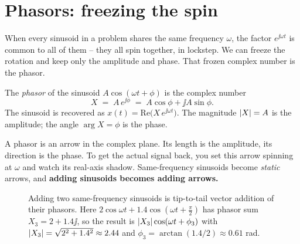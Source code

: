 \section{Phasors: freezing the spin}
\label{ch04:phasors}

When every sinusoid in a problem shares the same frequency $\omega$, the factor $e^{\jj\omega t}$
is common to all of them -- they all spin together, in lockstep. We can freeze the rotation and keep only the amplitude and phase. That frozen complex number is the phasor.

\begin{definition}[Phasor]
\label{ch04:def-phasor}
The \emph{phasor} of the sinusoid $A\cos(\omega t + \phi)$ is the complex number
\[
  X \;=\; A\,e^{\jj\phi} \;=\; A\cos\phi + \jj A\sin\phi .
\]
The sinusoid is recovered as $x(t) = \mathrm{Re}\big(X\,e^{\jj\omega t}\big)$. The magnitude
$\lvert X\rvert = A$ is the amplitude; the angle $\arg X = \phi$ is the phase.
\end{definition}

A phasor is an arrow in the complex plane. Its length is the amplitude, its direction is the phase.
To get the actual signal back, you set this arrow spinning at $\omega$ and watch its real-axis
shadow. Same-frequency sinusoids become \emph{static} arrows, and
\textbf{adding sinusoids becomes adding arrows.}

\begin{figure}[H]
\centering
{}
\caption{Adding two same-frequency sinusoids is tip-to-tail vector addition of their phasors. Here
$2\cos\omega t + 1.4\cos(\omega t + \tfrac{\pi}{2})$ has phasor sum $X_3 = 2 + 1.4\jj$, so the
result is $\lvert X_3\rvert\cos(\omega t + \phi_3)$ with $\lvert X_3\rvert = \sqrt{2^2 + 1.4^2} \approx 2.44$ and
$\phi_3 = \arctan(1.4/2) \approx 0.61$ rad.}
\label{ch04:fig-phasor-add}
\end{figure}

